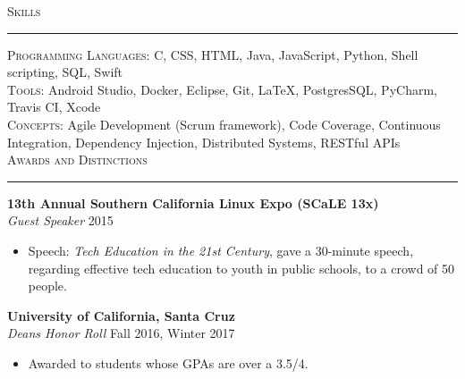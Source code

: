 \documentclass{res}
\begin{document}
\begin{resume}
\textsc{{\Large Skills}}
\vspace{0.5mm}
\hrule width18.5cm
	\textsc{Programming Languages:} C, CSS, HTML, Java, JavaScript, Python, Shell scripting, SQL, Swift\\[2mm]
	\textsc{Tools:} Android Studio, Docker, Eclipse, Git, \LaTeX, PostgresSQL, PyCharm, Travis CI, Xcode\\[2mm]
	\textsc{Concepts:} Agile Development (Scrum framework), Code Coverage, Continuous Integration, Dependency Injection, Distributed Systems, RESTful APIs\\[0.5mm]

\textsc{{\Large Awards and Distinctions}}
\vspace{0.5mm}
\hrule width18.5cm
\textbf{13th Annual Southern California Linux Expo (SCaLE 13x)}\\
\textit{Guest Speaker}
\hfill
2015\\
	\begin{itemize}
		\vspace{-3mm}
		\item Speech: \textit{Tech Education in the 21st Century}, gave a 30-minute speech, regarding effective tech education to youth in public schools, to a crowd of 50 people.
	\end{itemize}
\textbf{University of California, Santa Cruz}\\
\textit{Dean\textquotesingle s Honor Roll}
\hfill
Fall 2016, Winter 2017\\
	\begin{itemize}
		\vspace{-3mm}
		\item Awarded to students whose GPAs are over a 3.5/4.
	\end{itemize}
\vspace{-1mm}

\end{resume}
\end{document}
